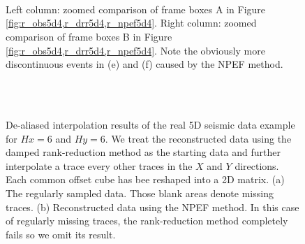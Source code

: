 {\begin{figure}[htb!]
   \centering
   \\
   \\
   \\
\caption{Left column: zoomed comparison of frame boxes A in Figure \ref{fig:r_obs5d4,r_drr5d4,r_npef5d4}. Right column: zoomed comparison of frame boxes B in Figure \ref{fig:r_obs5d4,r_drr5d4,r_npef5d4}. Note the obviously more discontinuous events in (e) and (f) caused by the NPEF method.}
\label{fig:r_obs5d2a,r_obs5d2b,r_drr5d2a,r_drr5d2b,r_npef5d2a,r_npef5d2b}
\end{figure}


\begin{figure}[htb!]
   \centering
  \subfloat[]{\texttt{[image: real5d/Fig/r\_obs5d\_new-3-0]}
   \label{fig:ra_obs5d}}\\
   \\
\caption{De-aliased interpolation results of the real 5D seismic data example for $Hx=6$ and $Hy=6$. We treat the reconstructed data using the damped rank-reduction method as the starting data and further interpolate a trace every other traces in the $X$ and $Y$ directions. Each common offset cube has bee reshaped into a 2D matrix. (a) The regularly sampled data. Those blank areas denote missing traces. (b) Reconstructed data using the NPEF method. In this case of regularly missing traces, the rank-reduction method completely fails so we omit its result.}
\label{fig:ra_obs5d,ra_npef5d}
\end{figure}

\begin{figure}[htb!]
   \centering
   \\
   \\
\caption{}
\label{fig:ra_obs5d_new-3fk,ra_npef5d_new-3fk}
\end{figure}

}
